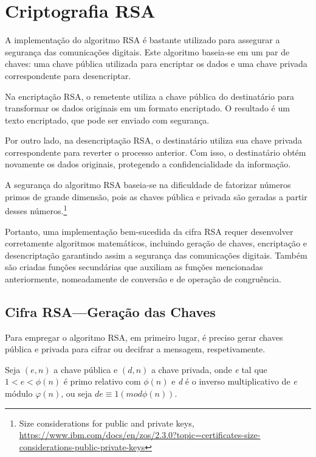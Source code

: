 
\chapter{Criptografia RSA}
\label{sec:criptografiaRSA}

A implementação do algoritmo RSA é bastante utilizado para assegurar a segurança das comunicações digitais. Este algoritmo baseia-se em um par de chaves: uma chave pública utilizada para encriptar os dados e uma chave privada correspondente para desencriptar.

Na encriptação RSA, o remetente utiliza a chave pública do destinatário para transformar os dados originais em um formato encriptado. O resultado é um texto encriptado, que pode ser enviado com segurança.

Por outro lado, na desencriptação RSA, o destinatário utiliza sua chave privada correspondente para reverter o processo anterior. Com isso, o destinatário obtém novamente os dados originais, protegendo a confidencialidade da informação.

A segurança do algoritmo RSA baseia-se na dificuldade de fatorizar números primos de grande dimensão, pois as chaves pública e privada são geradas a partir desses números.\footnote{Size considerations for public and private keys, \url{https://www.ibm.com/docs/en/zos/2.3.0?topic=certificates-size-considerations-public-private-keys}}

Portanto, uma implementação bem-sucedida da cifra RSA requer desenvolver corretamente algoritmos matemáticos, incluindo geração de chaves, encriptação e  desencriptação garantindo assim a segurança das comunicações digitais. Também são criadas funções secundárias que auxiliam as funções mencionadas anteriormente, nomeadamente de conversão e de operação de congruência.

\section{Cifra RSA---Geração das Chaves}
\label{ec:cifraRSAGeracaoChaves}
Para empregar o algoritmo RSA, em primeiro lugar,  é preciso gerar chaves pública e privada para cifrar ou decifrar a mensagem, respetivamente.  

Seja $(e,n)$ a chave pública e $(d,n)$ a chave privada, onde \emph{e} tal que $1<e<\phi(n)$ é primo relativo com $\phi(n)$ e \emph{d} é o inverso multiplicativo de \emph{e} módulo $\varphi(n)$, ou seja $de \equiv 1(mod \phi(n))$.

